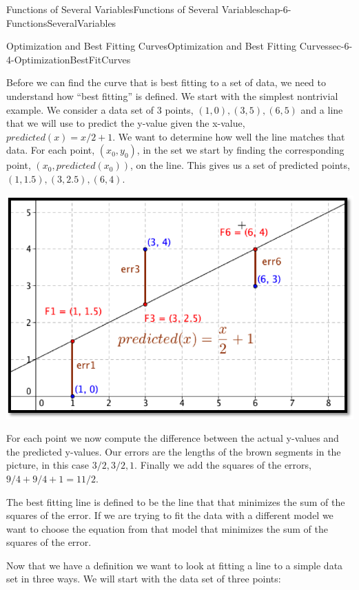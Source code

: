 \documentclass[oneside,10pt,]{book}
\numberwithin{equation}{section}
\begin{document}
\begin{chapterptx}{Functions of Several Variables}{}{Functions of Several Variables}{}{}{chap-6-FunctionsSeveralVariables}
\begin{sectionptx}{Optimization and Best Fitting Curves}{}{Optimization and Best Fitting Curves}{}{}{sec-6-4-OptimizationBestFitCurves}
\par
\hypertarget{p-2440}{}%
Before we can find the curve that is best fitting to a set of data, we need to understand how “best fitting” is defined.  We start with the simplest nontrivial example.  We consider a data set of 3 points, \({(1,0),(3,5),(6,5)}\) and a line that we will use to predict the y-value given the x-value, \(predicted(x)=x/2 +1\).  We want to determine how well the line matches that data.  For each point, \((x_0,y_0)\), in the set we start by finding the corresponding point, \((x_0,predicted(x_0 ))\), on the line.  This gives us a set of predicted points, \({(1,1.5),(3,2.5),(6,4)}\).%
\begin{sidebyside}{1}{0.1}{0.1}{0}%
\begin{sbspanel}{0.8}%
\includegraphics[width=1\linewidth]{images/sec-6-4-1.png}
\end{sbspanel}%
\end{sidebyside}%
\par
\hypertarget{p-2441}{}%
For each point we now compute the difference between the actual y-values and the predicted y-values.  Our errors are the lengths of the brown segments in the picture, in this case \({3/2,3/2,1}\).  Finally we add the squares of the errors, \(9/4+9/4+1=11/2\).%
\par
\hypertarget{p-2442}{}%
The best fitting line is defined to be the line that that minimizes the sum of the squares of the error.  If we are trying to fit the data with a different model we want to choose the equation from that model that minimizes the sum of the squares of the error.%
\par
\hypertarget{p-2443}{}%
Now that we have a definition we want to look at fitting a line to a simple data set in three ways.  We will start with the data set of three points: \leavevmode%

\end{sectionptx}
\end{chapterptx}
\end{document}
